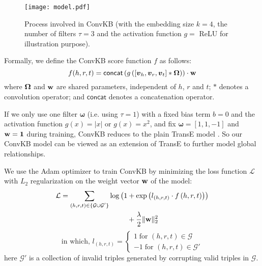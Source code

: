 \documentclass[11pt,a4paper]{article}
\begin{document}
\begin{figure}[t]
\centering
\texttt{[image: model.pdf]}
\caption{Process involved in  ConvKB   (with the embedding size $k=4$,  the number of filters $\tau=3$ and the  activation function $g=$ ReLU for illustration purpose).}
\label{fig:ConvKB}
\end{figure}

Formally, we define the ConvKB score function $f$ as follows:
\begin{equation}
f(h,r,t) = \mathsf{concat}\left(g\left([\boldsymbol{v}_h,\boldsymbol{v}_r,\boldsymbol{v}_t]\ast\bold{\Omega}\right)\right)\cdot\bold{w} \nonumber
\end{equation}
where $\bold{\Omega}$ and $\bold{w}$ are shared parameters, independent of $h$, $r$ and $t$; $\ast$ denotes a convolution operator; and $\mathsf{concat}$ denotes a concatenation operator.

If we   only use one filter $\boldsymbol{\omega}$ (i.e. using  $\tau=1$) with a fixed  bias term $b=0$ and the  activation function $g(x)=|x|$ or $g(x)=x^2$, and fix $\boldsymbol{\omega} = [1, 1, -1]$ and $\bold{w} = \textbf{1}$ during training,    ConvKB reduces to the plain TransE model \citep{NIPS2013_5071}. So our  ConvKB  model can be viewed as an extension of   TransE  to further model global relationships. 

We use the Adam optimizer \citep{kingma2014adam} to train ConvKB by minimizing the loss function $\mathcal{L}$ \citep{Trouillon2016} with $L_2$ regularization on the weight vector $\bold{w}$ of the model:
\begin{align}
\mathcal{L} & =  \sum_{\substack{(h,r,t) \in \{\mathcal{G} \cup \mathcal{G}'\}}} \log\left(1 + \exp\left(l_{(h,r,t)} \cdot f\left(h,r,t\right)\right)\right) \nonumber \\
& \ \ \ \ \ \ \ \ \ \ \ \ \ \ \ \ \ \ \ \  \ \ \ \ \ \ \ \ + \frac{\lambda}{2}\|\bold{w}\|^2_2  \nonumber
 \label{equal:objfunc}
  \end{align}
\begin{equation*}
\text{in which, } l_{(h,r,t)} = \left\{ 
  \begin{array}{l}
  1\;\text{for } (h,r,t)\in\mathcal{G}\\
 -1\;\text{for } (h,r,t)\in\mathcal{G}'
  \end{array} \right.
\end{equation*}
here $\mathcal{G}'$ is a collection of invalid triples generated by corrupting valid  triples in $\mathcal{G}$. 
\end{document}
